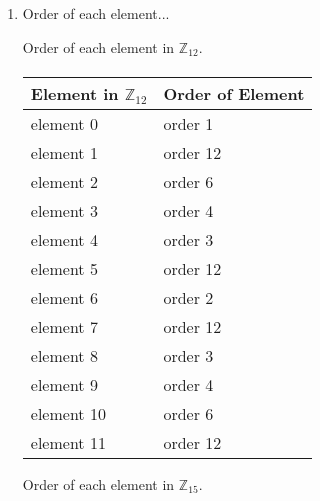 \documentclass{amsart}
\begin{document}
    
    \begin{enumerate}
    
    \item Order of each element...
    
    Order of each element in $\mathbb{Z}_{12}$.
    
    \vspace{4pt}
    
    \paragraph{}
    
    \begin{tabular}{ll}
    
    Element in $\mathbb{Z}_{12}$ & Order of Element \\
    \hline
    element 0 & order 1 \\
    element 1 & order 12 \\
    element 2 & order 6 \\
    element 3 & order 4 \\
    element 4 & order 3 \\
    element 5 & order 12 \\
    element 6 & order 2 \\
    element 7 & order 12 \\
    element 8 & order 3 \\
    element 9 & order 4 \\
    element 10 & order 6 \\
    element 11 & order 12
    
    \end{tabular}
    
    \vspace{8pt}
    
    Order of each element in $\mathbb{Z}_{15}$.
    
    \paragraph{}
    \vspace{4pt}
    
    \begin{tabular}{ll}
    

\end{tabular}
\end{enumerate}
\end{document}
